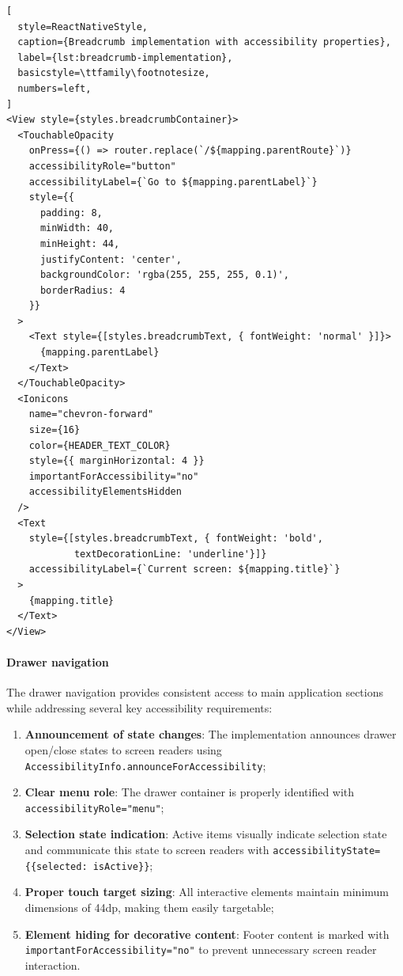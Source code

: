 \begin{lstlisting}[
  style=ReactNativeStyle,
  caption={Breadcrumb implementation with accessibility properties},
  label={lst:breadcrumb-implementation},
  basicstyle=\ttfamily\footnotesize,
  numbers=left,
]
<View style={styles.breadcrumbContainer}>
  <TouchableOpacity
    onPress={() => router.replace(`/${mapping.parentRoute}`)}
    accessibilityRole="button"
    accessibilityLabel={`Go to ${mapping.parentLabel}`}
    style={{
      padding: 8,
      minWidth: 40,
      minHeight: 44,
      justifyContent: 'center',
      backgroundColor: 'rgba(255, 255, 255, 0.1)',
      borderRadius: 4
    }}
  >
    <Text style={[styles.breadcrumbText, { fontWeight: 'normal' }]}>
      {mapping.parentLabel}
    </Text>
  </TouchableOpacity>
  <Ionicons
    name="chevron-forward"
    size={16}
    color={HEADER_TEXT_COLOR}
    style={{ marginHorizontal: 4 }}
    importantForAccessibility="no"
    accessibilityElementsHidden
  />
  <Text
    style={[styles.breadcrumbText, { fontWeight: 'bold', 
            textDecorationLine: 'underline'}]}
    accessibilityLabel={`Current screen: ${mapping.title}`}
  >
    {mapping.title}
  </Text>
</View>
\end{lstlisting}

\FloatBarrier

\paragraph{Drawer navigation}

The drawer navigation provides consistent access to main application sections while addressing several key accessibility requirements:

\begin{enumerate}
    \item \textbf{Announcement of state changes}: The implementation announces drawer open/close states to screen readers using \texttt{AccessibilityInfo.announceForAccessibility};
    
    \item \textbf{Clear menu role}: The drawer container is properly identified with \\ \texttt{accessibilityRole="menu"};
    
    \item \textbf{Selection state indication}: Active items visually indicate selection state and communicate this state to screen readers with \texttt{accessibilityState=\{\{selected: isActive\}\}};
    
    \item \textbf{Proper touch target sizing}: All interactive elements maintain minimum dimensions of 44dp, making them easily targetable;
    
    \item \textbf{Element hiding for decorative content}: Footer content is marked with \\ \texttt{importantForAccessibility="no"} to prevent unnecessary screen reader interaction.
\end{enumerate}

